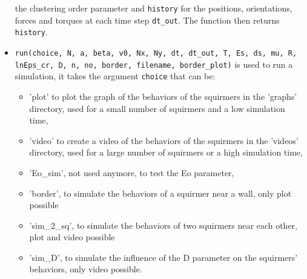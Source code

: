 \documentclass{article}
\begin{document}
\begin{itemize}
   the clustering order parameter and \texttt{history} for the positions, orientations,
   forces and torques at each time step \texttt{dt\_out}. The function then returns \texttt{history}.
   \item \texttt{run(choice, N, a, beta, v0, Nx, Ny, dt, dt\_out, T, Es, ds, mu, R, lnEps\_cr, D, n, no, border, filename, border\_plot)}
   is used to run a simulation, it takes the argument \texttt{choice} that can be:
   \begin{itemize}
    \item 'plot' to plot the graph of the behaviors of the squirmers in the 'graphs' directory, used for a small number of squirmers and a low simulation time,
    \item 'video' to create a video of the behaviors of the squirmers in the 'videos' directory, used for a large number of squirmers or a high simulation time,
    \item 'Eo\_sim', not used anymore, to test the Eo parameter,
    \item 'border', to simulate the behaviors of a squirmer near a wall, only plot possible
    \item 'sim\_2\_sq', to simulate the behaviors of two squirmers near each other, plot and video possible
    \item 'sim\_D', to simulate the influence of the D parameter on the squirmers' behaviors, only video possible.
   \end{itemize}
\end{itemize}
\end{document}
